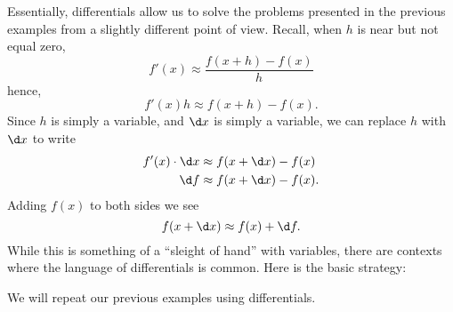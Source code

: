 \documentclass{ximera}
\begin{document}
Essentially, differentials allow us to solve the problems presented in
the previous examples from a slightly different point of view. Recall,
when $h$ is near but not equal zero,
\[
f'(x) \approx \frac{f(x+h)-f(x)}{h}
\]
hence, 
\[
f'(x)h \approx f(x+h)-f(x).
\]
Since $h$ is simply a variable, and $\d x$ is simply a variable, we can replace $h$ with $\d x$ to write
\begin{align*}
f'(x)\cdot \d x &\approx f(x+\d x)-f(x)\\
\d f &\approx f(x+\d x)-f(x).
\end{align*}
Adding $f(x)$ to both sides we see
\[
f(x+\d x)\approx f(x) + \d f.
\]
While this is something of a ``sleight of hand'' with variables, there
are contexts where the language of differentials is common. Here is
the basic strategy:
\begin{image}
\end{image}

We will repeat our previous examples using differentials.
\end{document}
